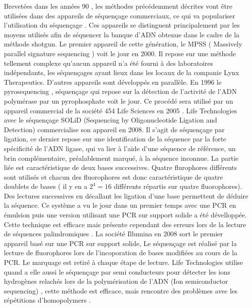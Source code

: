 Brevetées dans les années 90 \cite{tsien1991dna,farinelli1998method}, les méthodes précédemment décrites vont être utilisées dans des appareils de séquençage commerciaux, ce qui va populariser l'utilisation du séquençage \cite{Schuster2007}. Ces appareils se distinguent principalement par les moyens utilisés afin de séquencer la banque d'ADN obtenue dans le cadre de la méthode shotgun. Le premier appareil de cette génération, le MPSS ( Massively parallel signature sequencing \cite{Brenner2000}) voit le jour en 2000. Il repose sur une méthode tellement complexe qu'aucun appareil n'a été fourni à des laboratoires indépendants, les séquençages ayant lieux dans les locaux de la companie Lynx Therapeutics. D'autres appareils sont développés en parallèle. En 1996 le pyrosequencing \cite{Ronaghi1996}, séquençage qui repose sur la détection de l'activité de l'ADN polymérase par un pyrophosphate voit le jour. Ce procédé sera utilisé par un appareil commercial de la société 454 Life Sciences en 2005 \cite{Margulies2005}. Life Technologies avec le séquençage SOLiD \cite{mckernan2007reagents,Cloonan2008} (Sequencing by Oligonucleotide Ligation and Detection) commercialise son appareil en 2008. Il s'agit de séquençage par ligation, ce dernier repose sur une identification de la séquence par la forte spécificité de l'ADN ligase, qui va lier à l'aide d'une séquence de référence, un brin complémentaire, préalablement marqué, à la séquence inconnue. La partie liée est caractéristique de deux bases successives. Quatre flurophores différents sont utilisés et chacun des fluorophores est donc caractéristique de quatre doublets de bases ( il y en a $2^{4}=16$ différents répartis sur quatre fluorophores). Des lectures successives en décallant les ligation d'une base permettent de déduire la séquence. Ce système a vu le jour dans un premier temps avec une PCR en émulsion puis une version utilisant une PCR sur support solide a été dévelloppée. Cette technique est efficace mais présente cependant des erreurs lors de la lecture de séquences palindromiques \cite{Huang2012}. La société Illumina en 2008 \cite{Bentley2008} sort le premier appareil basé sur une PCR sur support solide, Le séquençage est réalisé par la lecture de fluorophores lors de l'incoporation de bases modifiées au cours de la PCR. Le marquage est retiré à chaque étape de lecture. Life Technologies utilise quand a elle aussi le séquençage par semi conducteurs pour détecter les ions hydrogènes relachés lors de la polymérisation de l'ADN (Ion semiconductor sequencing) \cite{Rusk2010}, cette méthode est efficace, mais rencontre des  problèmes avec les répétitions d'homopolymers \cite{Rusk2010}. 

